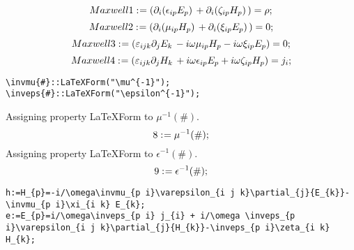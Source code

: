 \documentclass[11pt]{article}
\def\specialcolon{\mathrel{\mathop{:}}\hspace{-.5em}}
\begin{document}
\begin{dmath*}[compact, spread=2pt]
Maxwell1\specialcolon{}= ({\partial}_{i}{({\epsilon}_{i p} {E}_{p})}\,  + {\partial}_{i}{({\zeta}_{i p} {H}_{p})}\, ) = \rho;
\end{dmath*}
\begin{dmath*}[compact, spread=2pt]
Maxwell2\specialcolon{}= ({\partial}_{i}{({\mu}_{i p} {H}_{p})}\,  + {\partial}_{i}{({\xi}_{i p} {E}_{p})}\, ) = 0;
\end{dmath*}
\begin{dmath*}[compact, spread=2pt]
Maxwell3\specialcolon{}= ({\varepsilon}_{i j k} {\partial}_{j}{{E}_{k}}\,  - i \omega {\mu}_{i p} {H}_{p} - i \omega {\xi}_{i p} {E}_{p}) = 0;
\end{dmath*}
\begin{dmath*}[compact, spread=2pt]
Maxwell4\specialcolon{}= ({\varepsilon}_{i j k} {\partial}_{j}{{H}_{k}}\,  + i \omega {\epsilon}_{i p} {E}_{p} + i \omega {\zeta}_{i p} {H}_{p}) = {j}_{i};
\end{dmath*}
{\color[named]{Blue}\begin{verbatim}
\invmu{#}::LaTeXForm("\mu^{-1}");
\inveps{#}::LaTeXForm("\epsilon^{-1}");
\end{verbatim}}
Assigning property LaTeXForm to $\mu^{-1}(\#)$.
\\
\begin{dmath*}[compact, spread=2pt]
8\specialcolon{}= \mu^{-1}(\#);
\end{dmath*}
Assigning property LaTeXForm to $\epsilon^{-1}(\#)$.
\\
\begin{dmath*}[compact, spread=2pt]
9\specialcolon{}= \epsilon^{-1}(\#);
\end{dmath*}
{\color[named]{Blue}\begin{verbatim}
h:=H_{p}=-i/\omega\invmu_{p i}\varepsilon_{i j k}\partial_{j}{E_{k}}-\invmu_{p i}\xi_{i k} E_{k};
e:=E_{p}=i/\omega\inveps_{p i} j_{i} + i/\omega \inveps_{p i}\varepsilon_{i j k}\partial_{j}{H_{k}}-\inveps_{p i}\zeta_{i k} H_{k};
\end{verbatim}}
\end{document}
